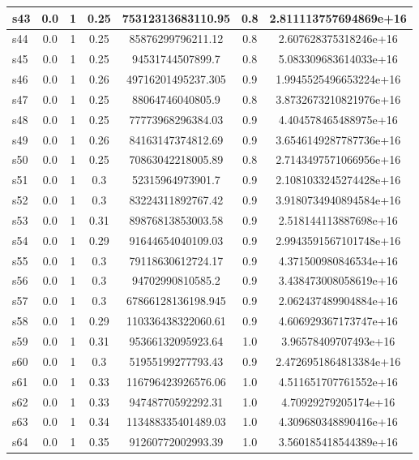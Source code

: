 \documentclass{article}
\begin{document}
\begin{tabular}{|l|c|c|c|c|c|c|}
\hline
s43 &0.0 & 1 & 0.25 & 75312313683110.95 & 0.8 & 2.811113757694869e+16\\
\hline
s44 &0.0 & 1 & 0.25 & 85876299796211.12 & 0.8 & 2.607628375318246e+16\\
\hline
s45 &0.0 & 1 & 0.25 & 94531744507899.7 & 0.8 & 5.083309683614033e+16\\
\hline
s46 &0.0 & 1 & 0.26 & 49716201495237.305 & 0.9 & 1.9945525496653224e+16\\
\hline
s47 &0.0 & 1 & 0.25 & 88064746040805.9 & 0.8 & 3.8732673210821976e+16\\
\hline
s48 &0.0 & 1 & 0.25 & 77773968296384.03 & 0.9 & 4.404578465488975e+16\\
\hline
s49 &0.0 & 1 & 0.26 & 84163147374812.69 & 0.9 & 3.6546149287787736e+16\\
\hline
s50 &0.0 & 1 & 0.25 & 70863042218005.89 & 0.8 & 2.7143497571066956e+16\\
\hline
s51 &0.0 & 1 & 0.3 & 52315964973901.7 & 0.9 & 2.1081033245274428e+16\\
\hline
s52 &0.0 & 1 & 0.3 & 83224311892767.42 & 0.9 & 3.9180734940894584e+16\\
\hline
s53 &0.0 & 1 & 0.31 & 89876813853003.58 & 0.9 & 2.518144113887698e+16\\
\hline
s54 &0.0 & 1 & 0.29 & 91644654040109.03 & 0.9 & 2.9943591567101748e+16\\
\hline
s55 &0.0 & 1 & 0.3 & 79118630612724.17 & 0.9 & 4.371500980846534e+16\\
\hline
s56 &0.0 & 1 & 0.3 & 94702990810585.2 & 0.9 & 3.438473008058619e+16\\
\hline
s57 &0.0 & 1 & 0.3 & 67866128136198.945 & 0.9 & 2.062437489904884e+16\\
\hline
s58 &0.0 & 1 & 0.29 & 110336438322060.61 & 0.9 & 4.606929367173747e+16\\
\hline
s59 &0.0 & 1 & 0.31 & 95366132095923.64 & 1.0 & 3.96578409707493e+16\\
\hline
s60 &0.0 & 1 & 0.3 & 51955199277793.43 & 0.9 & 2.4726951864813384e+16\\
\hline
s61 &0.0 & 1 & 0.33 & 116796423926576.06 & 1.0 & 4.511651707761552e+16\\
\hline
s62 &0.0 & 1 & 0.33 & 94748770592292.31 & 1.0 & 4.70929279205174e+16\\
\hline
s63 &0.0 & 1 & 0.34 & 113488335401489.03 & 1.0 & 4.309680348890416e+16\\
\hline
s64 &0.0 & 1 & 0.35 & 91260772002993.39 & 1.0 & 3.560185418544389e+16\\

\end{tabular}
\end{document}
